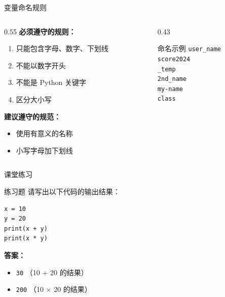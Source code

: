 \documentclass[aspectratio=43,12pt]{beamer}
\begin{document}
\begin{frame}{变量命名规则}
    \begin{columns}[T]
        \begin{column}{0.55\textwidth}
            \textbf{必须遵守的规则：}
            \begin{enumerate}
                \item 只能包含字母、数字、下划线
                \item 不能以数字开头
                \item 不能是 Python 关键字
                \item 区分大小写
            \end{enumerate}
            
            \vspace{0.5em}
            \textbf{建议遵守的规范：}
            \begin{itemize}
                \item 使用有意义的名称
                \item 小写字母加下划线
            \end{itemize}
        \end{column}
        \begin{column}{0.43\textwidth}
            \begin{exampleblock}{命名示例}
                \textcolor{green!60!black}{\cmark} \texttt{user\_name}\\
                \textcolor{green!60!black}{\cmark} \texttt{score2024}\\
                \textcolor{green!60!black}{\cmark} \texttt{\_temp}\\
                \vspace{0.3em}
                \textcolor{red}{\xmark} \texttt{2nd\_name}\\
                \textcolor{red}{\xmark} \texttt{my-name}\\
                \textcolor{red}{\xmark} \texttt{class}
            \end{exampleblock}
        \end{column}
    \end{columns}
\end{frame}

\begin{frame}{课堂练习}
    \begin{exampleblock}{练习题}
        请写出以下代码的输出结果：
        \begin{lstlisting}
x = 10
y = 20
print(x + y)
print(x * y)
        \end{lstlisting}
    \end{exampleblock}
    
    \pause
    \vspace{1em}
    \textbf{答案：}
    \begin{itemize}
        \item \texttt{30} （10 + 20 的结果）
        \item \texttt{200} （10 × 20 的结果）
    \end{itemize}
\end{frame}
\end{document}
